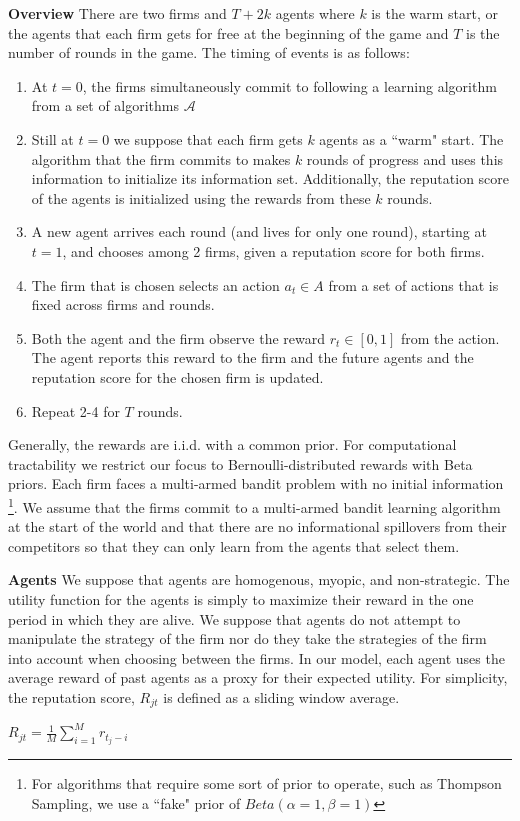 \documentclass{article}
\theoremstyle{definition}
\begin{document}
\textbf{Overview} There are two firms and $T+2k$ agents where $k$ is the warm start, or the agents that each firm gets for free at the beginning of the game and $T$ is the number of rounds in the game. The timing of events is as follows:
\begin{enumerate}
\item At $t = 0$, the firms simultaneously commit to following a learning algorithm from a set of algorithms $\mathcal{A}$
\item Still at $t = 0$ we suppose that each firm gets $k$ agents as a ``warm" start. The algorithm that the firm commits to makes $k$ rounds of progress and uses this information to initialize its information set. Additionally, the reputation score of the agents is initialized using the rewards from these $k$ rounds.
\item A new agent arrives each round (and lives for only one round), starting at $t = 1$, and chooses among 2 firms, given a reputation score for both firms.
\item The firm that is chosen selects an action $a_{t} \in A$ from a set of actions that is fixed across firms and rounds.
\item Both the agent and the firm observe the reward $r_t \in [0, 1]$ from the action. The agent reports this reward to the firm and the future agents and the reputation score for the chosen firm is updated.
\item Repeat 2-4 for $T$ rounds.
\end{enumerate}

Generally, the rewards are i.i.d. with a common prior.  For computational tractability we restrict our focus to Bernoulli-distributed rewards with Beta priors. Each firm faces a multi-armed bandit problem with no initial information \footnote{For algorithms that require some sort of prior to operate, such as Thompson Sampling, we use a ``fake" prior of $Beta(\alpha=1,\beta=1)$}. We assume that the firms commit to a multi-armed bandit learning algorithm at the start of the world and that there are no informational spillovers from their competitors so that they can only learn from the agents that select them.

\noindent \textbf{Agents} We suppose that agents are homogenous, myopic, and non-strategic. The utility function for the agents is simply to maximize their reward in the one period in which they are alive. We suppose that agents do not attempt to manipulate the strategy of the firm nor do they take the strategies of the firm into account when choosing between the firms. In our model, each agent uses the average reward of past agents as a proxy for their expected utility. For simplicity, the reputation score, $R_{jt}$ is defined as a sliding window average.
\begin{center}
$R_{jt} = \frac{1}{M} \sum\limits_{i=1}^{M} r_{t_j-i}$
\end{center}
\end{document}
